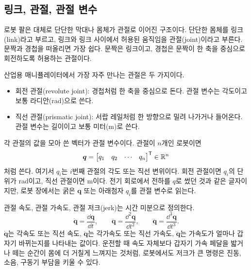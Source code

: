 \subsection{링크, 관절, 관절 변수}
\label{sec:robotics-links-joints-variables}

로봇 팔은 대체로 단단한 막대나 몸체가 관절로 이어진 구조이다.
단단한 몸체를 링크(link)라고 부르고, 링크와 링크 사이에서 허용된 움직임을 관절(joint)이라고 부른다.
문짝과 경첩을 떠올리면 가장 쉽다.
문짝은 링크이고, 경첩은 문짝이 한 축을 중심으로 회전하도록 허용하는 관절이다.

산업용 매니퓰레이터에서 가장 자주 만나는 관절은 두 가지이다.
\begin{itemize}
  \item 회전 관절(revolute joint): 경첩처럼 한 축을 중심으로 돈다. 관절 변수는 각도이고 보통 라디안(rad)으로 쓴다.
  \item 직선 관절(prismatic joint): 서랍 레일처럼 한 방향으로 밀려 나가거나 들어온다. 관절 변수는 길이이고 보통 미터(m)로 쓴다.
\end{itemize}

각 관절의 값을 모아 쓴 벡터가 관절 변수이다.
관절이 \(n\)개인 로봇이면
\begin{equation}
  \bm{q}
  =
  \begin{bmatrix}
    q_1 & q_2 & \cdots & q_n
  \end{bmatrix}^{\mathsf{T}}
  \in \mathbb{R}^n
\end{equation}
처럼 쓴다.
여기서 \(q_i\)는 \(i\)번째 관절의 각도 또는 직선 변위이다.
회전 관절이면 \(q_i\)의 단위가 rad이고, 직선 관절이면 m이다.
전기 회로에서 전하를 \(q\)로 썼던 것과 같은 글자이지만, 로봇 장에서는 굵은 \(\bm{q}\) 또는 아래첨자 \(q_i\)를 관절 변수로 읽는다.

관절 속도, 관절 가속도, 관절 저크(jerk)는 시간 미분으로 정의한다.
\begin{equation}
  \dot{\bm{q}}=\frac{\dd \bm{q}}{\dd t},
  \qquad
  \ddot{\bm{q}}=\frac{\dd^2 \bm{q}}{\dd t^2},
  \qquad
  \dddot{\bm{q}}=\frac{\dd^3 \bm{q}}{\dd t^3}.
\end{equation}
\(\dot{\bm{q}}\)는 각속도 또는 직선 속도, \(\ddot{\bm{q}}\)는 각가속도 또는 직선 가속도, \(\dddot{\bm{q}}\)는 가속도가 얼마나 갑자기 바뀌는지를 나타내는 값이다.
운전할 때 속도 자체보다 갑자기 가속 페달을 밟거나 떼는 순간이 몸에 더 거칠게 느껴지는 것처럼, 로봇에서도 저크가 큰 명령은 진동, 소음, 구동기 부담을 키울 수 있다.

